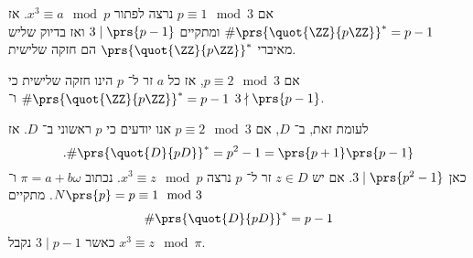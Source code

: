 \documentclass[a4paper,10pt,twoside,openany]{book}
\begin{document}
אם
$p \equiv 1 \mod{3}$
נרצה לפתור
$x^3 \equiv a \mod{p}$.
אז
$\# \prs{\quot{\ZZ}{p\ZZ}}^* = p-1$
ומתקיים
$3 \mid \prs{p-1}$
ואז בדיוק שליש מאיברי
$\prs{\quot{\ZZ}{p\ZZ}}^*$
הם חזקה שלישית.


אם
$p \equiv 2 \mod{3}$,
אז כל
$a$
זר ל־%
$p$
הינו חזקה שלישית כי
$\# \prs{\quot{\ZZ}{p\ZZ}}^* = p-1$
ו־%
$3 \nmid \prs{p-1}$.

לעומת זאת, ב־%
$D$,
אם
$p \equiv 2 \mod{3}$
אנו יודעים כי
$p$
ראשוני ב־%
$D$.
אז
\[\text{.} \#{\prs{\quot{D}{pD}}^*} = p^2 - 1 = \prs{p+1}\prs{p-1}\]
כאן
$3 \mid \prs{p^2 - 1}$.
אם יש
$z \in D$
זר ל־%
$p$
נרצה
$x^3 \equiv z \mod{p}$.
נכתוב
$\pi = a+b\omega$
ו־%
$N\prs{p} = p \equiv 1 \mod{3}$.
מתקיים
\[\# \prs{\quot{D}{pD}}^* = p-1\]
כאשר
$3 \mid p-1$
נקבל
$x^3 \equiv z \mod{\pi}$.
\backmatter
\end{document}
